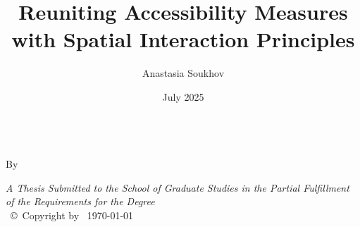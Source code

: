 \documentclass[
11pt, %
oneside, %
english, %
singlespacing, %
]{macthesis} %
\title{Reuniting Accessibility Measures with Spatial Interaction Principles}
\author{Anastasia Soukhov}
\date{July 2025}
\def\blankpage{%
      \clearpage%
      \thispagestyle{empty}%
      \addtocounter{page}{-1}%
      \null%
      \clearpage}
\begin{document}
\sloppy

\frontmatter %

\pagestyle{plain} %

\vspace{6cm}
\begin{center}
\ttitle
\end{center}
\clearpage

\begin{center}

\vfill
\textsc{\Large \ttitle} \\

\vfill
{By \authorname\, \bdeg \, \mdeg }


 \vfill
{\large \textit{A Thesis Submitted to the School of Graduate Studies in the Partial Fulfillment of the Requirements for the Degree \degreename}}\\

\vfill
{\large \univname\, \copyright\, Copyright by \authorname\, \today}\\[4cm] %

\end{center}
\blankpage
\clearpage



\blankpage
\clearpage

\end{document}
